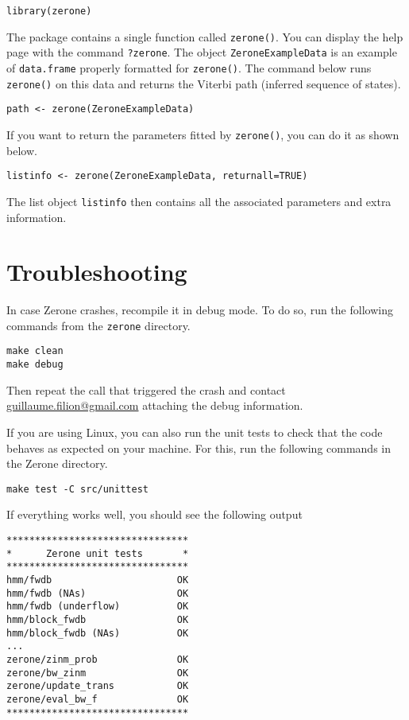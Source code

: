 \documentclass[12pt]{article}
\begin{document}
\begin{verbatim}
library(zerone)
\end{verbatim}

The package contains a single function called \texttt{zerone()}.
You can display the help page with the command \texttt{?zerone}.
The object \texttt{ZeroneExampleData} is an example of
\texttt{data.frame} properly formatted for \texttt{zerone()}.
The command below runs \texttt{zerone()} on this data and
returns the Viterbi path (inferred sequence of states).

\begin{verbatim}
path <- zerone(ZeroneExampleData)
\end{verbatim}

If you want to return the parameters fitted by \texttt{zerone()},
you can do it as shown below.

\begin{verbatim}
listinfo <- zerone(ZeroneExampleData, returnall=TRUE)
\end{verbatim}

The list object \texttt{listinfo} then contains all the associated
parameters and extra information.

\section{Troubleshooting}

In case Zerone crashes, recompile it in debug mode. To do so,
run the following commands from the \texttt{zerone} directory.

\begin{verbatim}
make clean
make debug
\end{verbatim}

Then repeat the call that triggered the crash and contact
\href{mailto:guillaume.filion@gmail.com}{guillaume.filion@gmail.com}
attaching the debug information.

If you are using Linux, you can also run the unit tests to check
that the code behaves as expected on your machine. For this,
run the following commands in the Zerone directory.

\begin{verbatim}
make test -C src/unittest
\end{verbatim}

If everything works well, you should see the following output

\begin{verbatim}
********************************
*      Zerone unit tests       *
********************************
hmm/fwdb                      OK
hmm/fwdb (NAs)                OK
hmm/fwdb (underflow)          OK
hmm/block_fwdb                OK
hmm/block_fwdb (NAs)          OK
...
zerone/zinm_prob              OK
zerone/bw_zinm                OK
zerone/update_trans           OK
zerone/eval_bw_f              OK
********************************
\end{verbatim}
\end{document}
